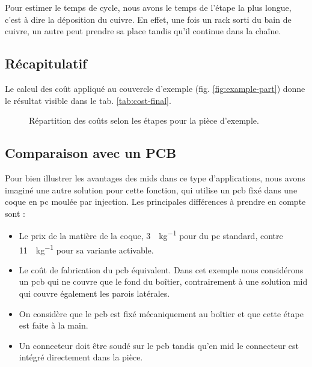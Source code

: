 Pour estimer le temps de cycle, nous avons le temps de l'étape la plus longue, c'est à dire la déposition du cuivre.
En effet, une fois un rack sorti du bain de cuivre, un autre peut prendre sa place tandis qu'il continue dans la chaîne.



\subsection{Récapitulatif}
Le calcul des coût appliqué au couvercle d'exemple (fig. \ref{fig:example-part}) donne le résultat visible dans le tab. \ref{tab:cost-final}.


\begin{figure}[h!]

    \begin{center}
        \caption{Répartition des coûts selon les étapes pour la pièce d'exemple.}\label{fig:cost-repartition}
    \end{center}
\end{figure}

\subsection{Comparaison avec un PCB}
Pour bien illustrer les avantages des \glspl{mid} dans ce type d'applications, nous avons imaginé une autre solution pour cette fonction, qui utilise un \gls{pcb} fixé dans une coque en \gls{pc} moulée par injection.
Les principales différences à prendre en compte sont :
\begin{itemize}
    \item Le prix de la matière de la coque, \SI{3}{\chf\per\kilogram} pour du \gls{pc} standard, contre \SI{11}{\chf\per\kilogram} pour sa variante activable.
    \item Le coût de fabrication du \gls{pcb} équivalent.
        Dans cet exemple nous considérons un \gls{pcb} qui ne couvre que le fond du boîtier, contrairement à une solution \gls{mid} qui couvre également les parois latérales.
    \item On considère que le \gls{pcb} est fixé mécaniquement au boîtier et que cette étape est faite à la main.
    \item Un connecteur doit être soudé sur le \gls{pcb} tandis qu'en \gls{mid} le connecteur est intégré directement dans la pièce.
\end{itemize}

